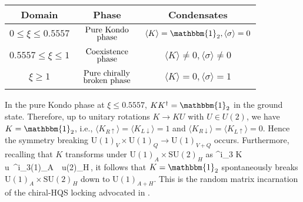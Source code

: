 \documentclass[aps,prd,longbibliography,reprint]{revtex4-2}
\DeclareMathOperator\rme{\mathrm{e}}
\newcommand{\SU}{\text{SU}}
\newcommand{\U}{\text{U}}
\newcommand{\1}{\mathbbm{1}}
\newcommand{\up}{\uparrow}
\newcommand{\down}{\downarrow}
\def\ba#1\ea{\begin{align}#1\end{align}}
\begin{document}
	\begin{tabular}{|c||c|c|}
		\hline
		Domain & Phase & Condensates
		\\\hline\hline 
		$0\leq \xi \leq 0.5557$ & $\begin{array}{c}\text{Pure Kondo}\vspace{-3pt}\\\text{phase}\end{array}$ & $\langle K\rangle=\1_2,\langle \sigma \rangle=0$
		\\\hline 
		$0.5557\leq \xi \leq 1$ & $\begin{array}{c}\text{Coexistence}\vspace{-3pt}\\\text{phase}\end{array}$ & $\langle K \rangle\ne 0, \langle\sigma\rangle\ne 0$
		\\\hline  
		$\xi\geq 1$ & $\begin{array}{c}\text{Pure chirally} \vspace{-3pt}\\ \text{broken phase}\end{array}$ & $\langle K \rangle=0,\langle\sigma\rangle=1$
		\\\hline
	\end{tabular}
	\notag
\ea
In the pure Kondo phase at $\xi\leq 0.5557$, $KK^\dagger=\1_2$ in the ground state. Therefore, up to unitary rotations $K\to KU$ with $U\in U(2)$, we have $K=\1_2$, i.e., $\langle K_{R\up} \rangle=\langle K_{L\down} \rangle =1$ and $\langle K_{R\down} \rangle=\langle K_{L\up} \rangle=0$. Hence the symmetry breaking $\U(1)_V\times\U(1)_Q\to\U(1)_{V+Q}$ occurs. Furthermore, recalling that $K$ transforms under $\U(1)_A\times\SU(2)_H$ as 
\ba
	K \to \rme^{i\theta \sigma_3} K u\quad {}~\rme^{i\theta \sigma_3}\in\U(1)_A~~u\in\SU(2)_H\,,
\ea
it follows that $K=\1_2$ spontaneously breaks $\U(1)_A\times\SU(2)_H$ down to $\U(1)_{A+H}$. This is the random matrix incarnation of the chiral-HQS locking advocated in \cite{Yasui:2017izi,Yasui:2016svc}. 
\end{document}
